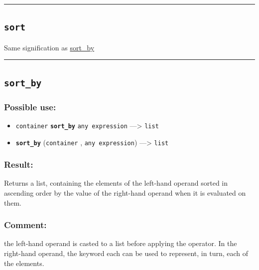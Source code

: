 \documentclass[]{book}
\providecommand{\tightlist}{%
  \setlength{\itemsep}{0pt}\setlength{\parskip}{0pt}}
\theoremstyle{definition}
\theoremstyle{definition}
\theoremstyle{definition}
\theoremstyle{remark}
\begin{document}
\begin{center}\rule{0.5\linewidth}{\linethickness}\end{center}

\subsection{\texorpdfstring{\texttt{sort}}{sort}}\label{sort}

Same signification as \href{operators-s-to-z.html\#sort_by}{sort\_by}

\begin{center}\rule{0.5\linewidth}{\linethickness}\end{center}

\subsection{\texorpdfstring{\texttt{sort\_by}}{sort\_by}}\label{sort_by}

\subsubsection{Possible use:}\label{possible-use-486}

\begin{itemize}
\tightlist
\item
  \texttt{container} \textbf{\texttt{sort\_by}} \texttt{any\ expression}
  ---\textgreater{} \texttt{list}
\item
  \textbf{\texttt{sort\_by}} (\texttt{container} ,
  \texttt{any\ expression}) ---\textgreater{} \texttt{list}
\end{itemize}

\subsubsection{Result:}\label{result-470}

Returns a list, containing the elements of the left-hand operand sorted
in ascending order by the value of the right-hand operand when it is
evaluated on them.

\subsubsection{Comment:}\label{comment-89}

the left-hand operand is casted to a list before applying the operator.
In the right-hand operand, the keyword each can be used to represent, in
turn, each of the elements.
\end{document}
